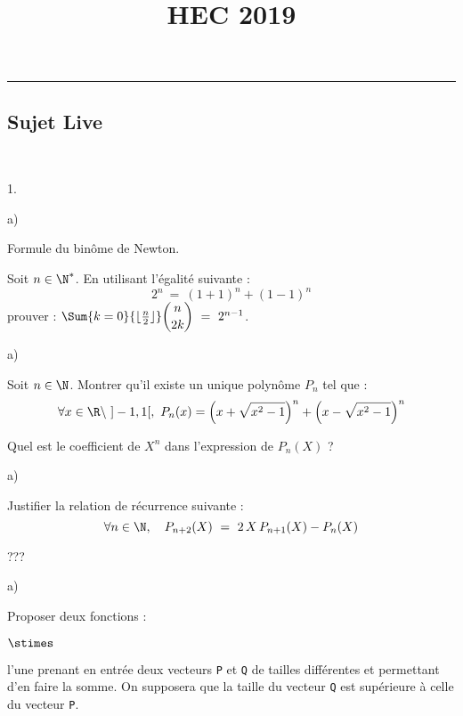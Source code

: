 \documentclass[11pt]{article}%
\title{\bf \vspace{-1.6cm} HEC 2019} %
\author{} %
\date{} %
\begin{document}
\maketitle %
\vspace{-1.2cm}\hrule %
\thispagestyle{fancy}

\vspace*{.2cm}


\subsection*{Sujet Live}

\begin{exerciceAP}~
  \begin{noliste}{1.}
  \item
    \begin{noliste}{a)}
    \item Formule du binôme de Newton.
      
    \item Soit $n \in \N^*$. En utilisant l'égalité suivante :
      \[
        2^n \ = \ (1+1)^n + (1-1)^n
      \]
      prouver : $\Sum{k=0}{\lfloor \frac{n}{2} \rfloor} \dbinom{n}{2k}
      \ = \ 2^{n-1}$.
    \end{noliste}
    
  \item
    \begin{noliste}{a)}
    \item Soit $n \in \N$. Montrer qu'il existe un unique polynôme
      $P_n$ tel que :
      \[
        \forall x \in \R \setminus \ ]-1,1[, \ P_n(x) = \left(x +
        \sqrt{x^2-1}\right)^n +
        \left(x - \sqrt{x^2-1}\right)^n
      \]
      
    \item Quel est le coefficient de $X^n$ dans l'expression de
      $P_n(X)$ ?
    \end{noliste}
    
  \item
    \begin{noliste}{a)}
    \item Justifier la relation de récurrence suivante :
      \[
        \forall n \in \N, \quad P_{n+2}(X) \ = \ 2 \, X \, P_{n+1}(X) -
        P_n(X)
      \]
      
    \item ???
    \end{noliste}
    
  \item
    \begin{noliste}{a)}
    \item Proposer deux fonctions \Scilab{} :
      \begin{noliste}{$\stimes$}
      \item l'une prenant en entrée deux vecteurs {\tt P} et {\tt Q}
        de tailles différentes et permettant d'en faire la somme. On supposera
        que la taille du vecteur {\tt Q} est supérieure à celle du
        vecteur {\tt P}.
        

\end{noliste}
\end{noliste}
\end{noliste}
\end{exerciceAP}
\end{document}
